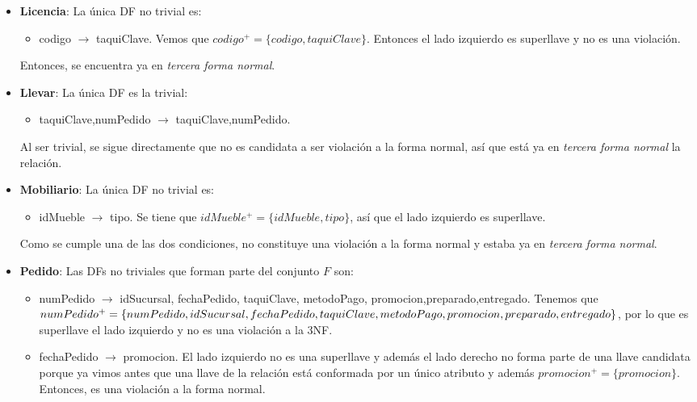 \documentclass[11pt,letterpaper]{article}
\begin{document}
\begin{itemize}
\item \textbf{Licencia}: La única DF no trivial es:

\begin{itemize}
\item codigo $\rightarrow$ taquiClave. Vemos que $codigo^+=\{codigo,taquiClave\}$. Entonces el lado izquierdo es superllave y no es una violación.
\end{itemize}

Entonces, se encuentra ya en \textit{tercera forma normal}.

\item \textbf{Llevar}:  La única DF es la trivial:

\begin{itemize}
\item taquiClave,numPedido $\rightarrow$ taquiClave,numPedido.
\end{itemize}

Al ser trivial, se sigue directamente que no es candidata a ser violación a la forma normal, así que está ya en \textit{tercera forma normal} la relación. 

\item \textbf{Mobiliario}: La única DF no trivial es:


\begin{itemize}

\item idMueble $\rightarrow$ tipo. Se tiene que $idMueble^+=\{idMueble,tipo\}$, así que el lado izquierdo es superllave.
\end{itemize}

Como se cumple una de las dos condiciones, no constituye una violación a la forma normal y estaba ya en \textit{tercera forma normal}.

\item \textbf{Pedido}: Las DFs no triviales que forman parte del conjunto $F$ son:

\begin{itemize}
\item numPedido $\rightarrow$ idSucursal, fechaPedido, taquiClave, metodoPago, promocion,preparado,entregado. Tenemos que $numPedido^+=\{numPedido,idSucursal, fechaPedido,\\ taquiClave, metodoPago, promocion,preparado,entregado\}$, por lo que es superllave el lado izquierdo y no es una violación a la 3NF.
\item fechaPedido $\rightarrow$ promocion. El lado izquierdo no es una superllave y además el lado derecho no forma parte de una llave candidata porque ya vimos antes que una llave de la relación está conformada por un único atributo y además $promocion^+=\{promocion\}$. Entonces, es una violación a la forma normal.
\end{itemize}


\end{itemize}
\end{document}
